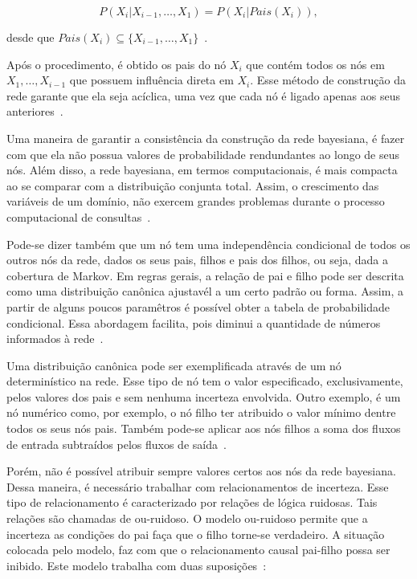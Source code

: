 \begin{equation}
    \label{eq:regra-cadeia}
    P(X_i|X_{i-1},\dots,X_1) = P(X_i|Pais(X_i)),
\end{equation}

desde que $Pais(X_i) \subseteq \{X_{i-1},\dots,X_1\}$~\cite{russell:2002}.

Após o procedimento, é obtido os pais do nó $X_i$ que contém todos os nós em $X_1, \dots, X_{i-1}$ que possuem influência direta em $X_i$. Esse método de construção da rede garante que ela seja acíclica, uma vez que cada nó é ligado apenas aos seus anteriores~\cite{russell:2002}.

Uma maneira de garantir a consistência da construção da rede bayesiana, é fazer com que ela não possua valores de probabilidade rendundantes ao longo de seus nós. Além disso, a rede bayesiana, em termos computacionais, é mais compacta ao se comparar com a distribuição conjunta total. Assim, o crescimento das variáveis de um domínio, não exercem grandes problemas durante o processo computacional de consultas~\cite{russell:2002, faceli:2011}.

Pode-se dizer também que um nó tem uma independência condicional de todos os outros nós da rede, dados os seus pais, filhos e pais dos filhos, ou seja, dada a cobertura de Markov. Em regras gerais, a relação de pai e filho pode ser descrita como uma distribuição canônica ajustavél a um certo padrão ou forma. Assim, a partir de alguns poucos paramêtros é possível obter a tabela de probabilidade condicional. Essa abordagem facilita, pois diminui a quantidade de números informados à rede~\cite{russell:2002}.

Uma distribuição canônica pode ser exemplificada através de um nó determinístico na rede. Esse tipo de nó tem o valor especificado, exclusivamente, pelos valores dos pais e sem nenhuma incerteza envolvida. Outro exemplo, é um nó numérico como, por exemplo, o nó filho ter atribuido o valor mínimo dentre todos os seus nós pais. Também pode-se aplicar aos nós filhos a soma dos fluxos de entrada subtraídos pelos fluxos de saída~\cite{russell:2002}.

Porém, não é possível atribuir sempre valores certos aos nós da rede bayesiana. Dessa maneira, é necessário trabalhar com relacionamentos de incerteza. Esse tipo de relacionamento é caracterizado por relações de lógica ruidosas. Tais relações são chamadas de ou-ruidoso. O modelo ou-ruidoso permite que a incerteza as condições do pai faça que o filho torne-se verdadeiro. A situação colocada pelo modelo, faz com que o relacionamento causal pai-filho possa ser inibido. Este modelo trabalha com duas suposições~\cite{russell:2002}:

